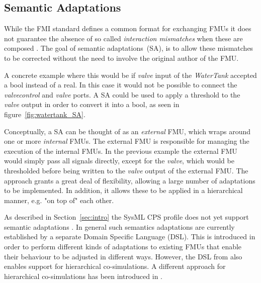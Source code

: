 \subsection{Semantic Adaptations}\label{sec:adaptation}

While the FMI standard defines a common format for exchanging FMUs it does not guarantee the absence of so called \emph{interaction mismatches} when these are composed \cite{Gomes&18a}.
The goal of semantic adaptations~(SA), is to allow these mismatches to be corrected without the need to involve the original author of the FMU.

A concrete example where this would be if \emph{valve} input of the \emph{WaterTank} accepted a bool instead of a real.
In this case it would not be possible to connect the \emph{valvecontrol} and \emph{valve} ports.
A SA could be used to apply a threshold to the \emph{valve} output in order to convert it into a bool, as seen in figure~\ref{fig:watertank_SA}.



Conceptually, a SA can be thought of as an \emph{external} FMU, which wraps around one or more \emph{internal} FMUs. The external FMU is responsible for managing the execution of the internal FMUs. In the previous example the external FMU would simply pass all signals directly, except for the \emph{valve}, which would be thresholded before being written to the \emph{valve} output of the external FMU.  
The approach grants a great deal of flexibility, allowing a large number of adaptations to be implemented. In addition, it allows these to be applied in a hierarchical manner, e.g. "on top of" each other.

As described in Section~\ref{sec:intro} the SysML CPS profile does not yet support semantic adaptations \cite{Gomes&18a}. In general such semantics adaptations are currently established by a separate Domain Specific Language (DSL). This is introduced in order to perform different kinds of adaptations to existing FMUs that enable their behaviour to be adjusted in different ways. However, the DSL from \cite{Gomes&18a} also enables support for hierarchical co-simulations. A different approach for hierarchical co-simulations has been introduced in \cite{Thule&19}. 





